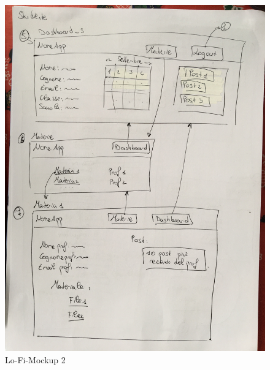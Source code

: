 \documentclass[Lau, binding=0.6cm]{sapthesis}
\begin{document}
\begin{figure}[H]
	\centering
	\includegraphics[width=1.3\linewidth, angle=-90]{images/mockup_2}
	\caption{Lo-Fi-Mockup 2}
	\label{fig:mockup_2}
\end{figure}
\end{document}
